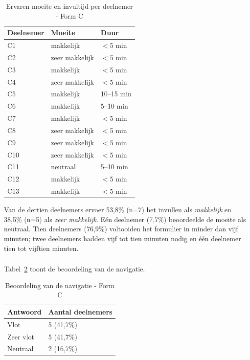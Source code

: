 \begin{table}[h]
  \centering
  \caption[Ervaren moeite en invultijd late test Form C]{Ervaren moeite en invultijd per deelnemer - Form C}
  \label{tab:laat-formc-moeite}
  \begin{tabular}{lll}
    \hline
    \textbf{Deelnemer} & \textbf{Moeite} & \textbf{Duur} \\
    \hline
    C1  & makkelijk      & $<$5 min   \\
    C2  & zeer makkelijk & $<$5 min   \\
    C3  & makkelijk      & $<$5 min   \\
    C4  & zeer makkelijk & $<$5 min   \\
    C5  & makkelijk      & 10–15 min  \\
    C6  & makkelijk      & 5–10 min   \\
    C7  & makkelijk      & $<$5 min   \\
    C8  & zeer makkelijk & $<$5 min   \\
    C9  & zeer makkelijk & $<$5 min   \\
    C10 & zeer makkelijk & $<$5 min   \\
    C11 & neutraal       & 5–10 min   \\
    C12 & makkelijk      & $<$5 min   \\
    C13 & makkelijk      & $<$5 min   \\
    \hline
  \end{tabular}
\end{table}

Van de dertien deelnemers ervoer 53,8\% (n=7) het invullen als \textit{makkelijk} en 38,5\% (n=5) als \textit{zeer makkelijk}. Eén deelnemer (7,7\%) beoordeelde de moeite als neutraal. Tien deelnemers (76,9\%) voltooiden het formulier in minder dan vijf minuten; twee deelnemers hadden vijf tot tien minuten nodig en één deelnemer tien tot vijftien minuten.

\subsubsection{}

Tabel~\ref{tab:laat-formc-navigatie} toont de beoordeling van de navigatie.

\begin{table}[h]
  \centering
  \caption[Beoordeling navigatie Form C]{Beoordeling van de navigatie - Form C}
  \label{tab:laat-formc-navigatie}
  \begin{tabular}{ll}
    \hline
    \textbf{Antwoord} & \textbf{Aantal deelnemers} \\
    \hline
    Vlot      & 5 (41,7\%) \\
    Zeer vlot & 5 (41,7\%) \\
    Neutraal  & 2 (16,7\%) \\
    \hline
  \end{tabular}
\end{table}

